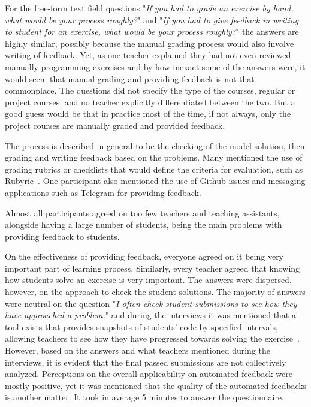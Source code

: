 For the free-form text field questions "\textit{If you had to grade an exercise by hand, what would be your process roughly?}" and "\textit{If you had to give feedback in writing to student for an exercise, what would be your process roughly?}" the answers are highly similar, possibly because the manual grading process would also involve writing of feedback. Yet, as one teacher explained they had not even reviewed manually programming exercises and by how inexact some of the answers were, it would seem that manual grading and providing feedback is not that commonplace. The questions did not specify the type of the courses, regular or project courses, and no teacher explicitly differentiated between the two. But a good guess would be that in practice most of the time, if not always, only the project courses are manually graded and provided feedback.

The process is described in general to be the checking of the model solution, then grading and writing feedback based on the problems. Many mentioned the use of grading rubrics or checklists that would define the criteria for evaluation, such as Rubyric~\cite{aalto-rubyric-2009}. One participant also mentioned the use of Github issues and messaging applications such as Telegram for providing feedback.

Almost all participants agreed on too few teachers and teaching assistants, alongside having a large number of students, being the main problems with providing feedback to students. 

On the effectiveness of providing feedback, everyone agreed on it being very important part of learning process. Similarly, every teacher agreed that knowing how students solve an exercise is very important. The answers were dispersed, however, on the approach to check the student solutions. The majority of answers were neutral on the question "\textit{I often check student submissions to see how they have approached a problem.}" and during the interviews it was mentioned that a tool exists that provides snapshots of students' code by specified intervals, allowing teachers to see how they have progressed towards solving the exercise~\cite{hy-code-browser-2014}. However, based on the answers and what teachers mentioned during the interviews, it is evident that the final passed submissions are not collectively analyzed. Perceptions on the overall applicability on automated feedback were mostly positive, yet it was mentioned that the quality of the automated feedbacks is another matter. It took in average 5 minutes to answer the questionnaire.

